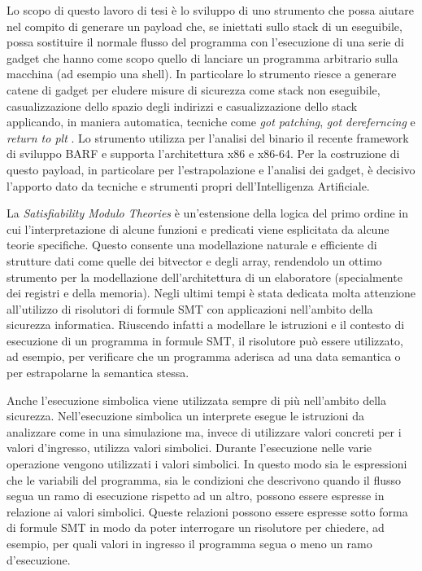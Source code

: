 Lo scopo di questo lavoro di tesi è lo sviluppo di uno strumento che
possa aiutare nel compito di generare un payload che, se iniettati
sullo stack di un eseguibile, possa sostituire il normale flusso del
programma con l'esecuzione di una serie di gadget che hanno come scopo
quello di lanciare un programma arbitrario sulla macchina (ad esempio
una shell). In particolare lo strumento riesce a generare catene di
gadget per eludere misure di sicurezza come stack non eseguibile,
casualizzazione dello spazio degli indirizzi e casualizzazione dello
stack applicando, in maniera automatica, tecniche come \emph{got
  patching}, \emph{got dereferncing} e \emph{return to plt}
\cite{roglia:2009}. Lo strumento utilizza per l'analisi del binario il
recente framework di sviluppo BARF \cite{Heitman-14} e supporta
l'architettura x86 e x86-64. Per la costruzione di questo payload, in
particolare per l'estrapolazione e l'analisi dei gadget, è decisivo
l'apporto dato da tecniche e strumenti propri dell'Intelligenza
Artificiale.

La \emph{Satisfiability Modulo Theories}\cite{Barrett-14} è
un'estensione della logica del primo ordine in cui l'interpretazione
di alcune funzioni e predicati viene esplicitata da alcune teorie
specifiche. Questo consente una modellazione naturale e efficiente di
strutture dati come quelle dei bitvector e degli array, rendendolo un
ottimo strumento per la modellazione dell'architettura di un
elaboratore (specialmente dei registri e della memoria). Negli ultimi
tempi è stata dedicata molta attenzione all'utilizzo di risolutori di
formule SMT con applicazioni nell'ambito della sicurezza
informatica\cite{Vanegue:2012}. Riuscendo infatti a modellare le
istruzioni e il contesto di esecuzione di un programma in formule SMT,
il risolutore può essere utilizzato, ad esempio, per verificare che un
programma aderisca ad una data semantica o per estrapolarne la
semantica stessa.

Anche l'esecuzione simbolica viene utilizzata sempre di più
nell'ambito della sicurezza. Nell'esecuzione simbolica un interprete
esegue le istruzioni da analizzare come in una simulazione ma, invece
di utilizzare valori concreti per i valori d'ingresso, utilizza valori
simbolici. Durante l'esecuzione nelle varie operazione vengono
utilizzati i valori simbolici. In questo modo sia le espressioni che
le variabili del programma, sia le condizioni che descrivono quando il
flusso segua un ramo di esecuzione rispetto ad un altro, possono
essere espresse in relazione ai valori simbolici.  Queste relazioni
possono essere espresse sotto forma di formule SMT in modo da poter
interrogare un risolutore per chiedere, ad esempio, per quali valori
in ingresso il programma segua o meno un ramo d'esecuzione.

